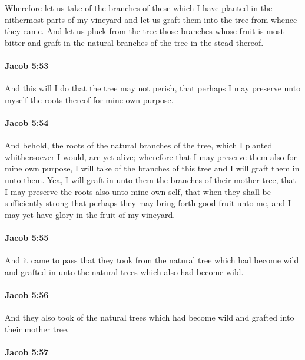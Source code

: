 			Wherefore let us take of the branches of these
			which I have planted in the nithermost parts of my vineyard
			and let us graft them into the tree from whence they came.
			And let us pluck from the tree those branches whose fruit is most bitter
			and graft in the natural branches of the tree in the stead thereof.

		\paragraph{Jacob 5:53} %
			\label{JACOB-5-53}

			And this will I do that the tree may not perish,
			that perhaps I may preserve unto myself the roots thereof for mine own purpose.

		\paragraph{Jacob 5:54} %
			\label{JACOB-5-54}

			And behold, the roots of the natural branches of the tree,
			which I planted whithersoever I would, are yet alive;
			wherefore that I may preserve them also for mine own purpose,
			I will take of the branches of this tree and I will graft them in unto them.
			Yea, I will graft in unto them the branches of their mother tree,
			that I may preserve the roots also unto mine own self,
			that when they shall be sufficiently strong
			that perhaps they may bring forth good fruit unto me,
			and I may yet have glory in the fruit of my vineyard.

		\paragraph{Jacob 5:55} %
			\label{JACOB-5-55}

			And it came to pass that they took from the natural tree which had become wild
			and grafted in unto the natural trees which also had become wild.

		\paragraph{Jacob 5:56} %
			\label{JACOB-5-56}

			And they also took of the natural trees which had become wild
			and grafted into their mother tree.

		\paragraph{Jacob 5:57} %
			\label{JACOB-5-57}

